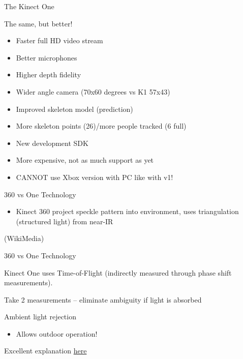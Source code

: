 \documentclass[compress]{beamer}
\begin{document}
\begin{frame}{The Kinect One}

The same, but better!

\begin{itemize}

\item
  Faster full HD video stream
\item
  Better microphones
\item
  Higher depth fidelity
\item
  Wider angle camera (70x60 degrees vs K1 57x43)
\item
  Improved skeleton model (prediction)
\item
  More skeleton points (26)/more people tracked (6 full)
\item
  New development SDK
\item
  More expensive, not as much support as yet
\item
  CANNOT use Xbox version with PC like with v1!
\end{itemize}

\end{frame}

\begin{frame}{360 vs One Technology}

\begin{itemize}

\item
  Kinect 360 project speckle pattern into environment, uses
  triangulation (structured light) from near-IR
\end{itemize}

(WikiMedia)

\end{frame}

\begin{frame}{360 vs One Technology}

Kinect One uses Time-of-Flight (indirectly measured through phase shift
measurements).

Take 2 measurements -- eliminate ambiguity if light is absorbed

Ambient light rejection

\begin{itemize}

\item
  Allows outdoor operation!
\end{itemize}

Excellent explanation
\href{http://www.gamasutra.com/blogs/DanielLau/20131127/205820/The_Science_Behind_Kinects_or_Kinect_10_versus_20.php}{here}

\end{frame}
\end{document}
